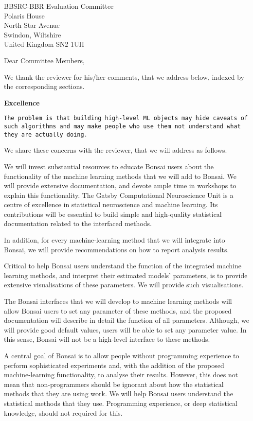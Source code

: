 \documentclass[12pt]{letter}
\begin{document}
\begin{letter}{
    BBSRC-BBR Evaluation Committee\\
    Polaris House\\
    North Star Avenue\\
    Swindon, Wiltshire\\
    United Kingdom SN2 1UH
}
\opening{Dear Committee Members,}

We thank the reviewer for his/her comments, that we address below, indexed by
the corresponding sections.

\noindent\textbf{Excellence}

    \texttt{The problem is that building high-level ML objects may hide caveats
    of such algorithms and may make people who use them not understand what
    they are actually doing.}


We share these concerns with the reviewer, that we will address as follows.

We will invest substantial resources to educate Bonsai users about the
functionality of the machine learning methods that we will add to Bonsai. We
will provide extensive documentation, and devote ample time in workshops to
explain this functionality.
%
The Gatsby Computational Neuroscience Unit is a centre of excellence in
statistical neuroscience and machine learning. Its contributions will be
essential to build simple and high-quality statistical documentation related to
the interfaced methods.

In addition, for every machine-learning method that we will integrate into
    Bonsai, we will provide recommendations on how to report analysis results.

Critical to help Bonsai users understand the function of the integrated machine
learning methods, and interpret their estimated models' parameters, is to
provide extensive visualisations of these parameters. We will provide such
visualisations.

The Bonsai interfaces that we will develop to machine learning methods will
allow Bonsai users to set any parameter of these methods, and the proposed
documentation will describe in detail the function of all parameters. Although,
we will provide good default values, users will be able to set any parameter
value. In this sense, Bonsai will not be a high-level interface to these
methods.

A central goal of Bonsai is to allow people without programming experience to
perform sophisticated experiments and, with the addition of the proposed
machine-learning functionality, to analyse their results. However, this does
not mean that non-programmers should be ignorant about how the statistical
methods that they are using work. We will help Bonsai users understand the
statistical methods that they use. Programming experience, or deep statistical
knowledge, should not required for this.


\end{letter}
\end{document}
